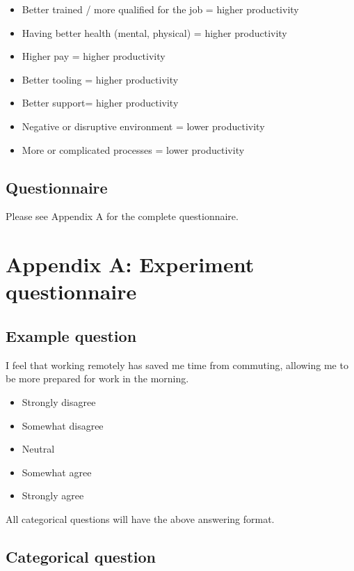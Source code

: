 \documentclass[12pt]{article}
\begin{document}
\begin{itemize}
  \item Better trained / more qualified for the job = higher productivity
  \item Having better health (mental, physical) = higher productivity
  \item Higher pay = higher productivity
  \item Better tooling = higher productivity
  \item Better support= higher productivity
  \item Negative or disruptive environment = lower productivity
  \item More or complicated processes = lower productivity
\end{itemize}

\subsection*{Questionnaire}
Please see Appendix A for the complete questionnaire.





\appendix
\section*{Appendix A: Experiment questionnaire}

\subsection*{Example question}
I feel that working remotely has saved me time from commuting, allowing me to be more prepared for work in the morning. 
\begin{itemize}
  \item Strongly disagree
  \item Somewhat disagree
  \item Neutral
  \item Somewhat agree
  \item Strongly agree
\end{itemize}
All categorical questions will have the above answering format.
\subsection*{Categorical question}
\end{document}

